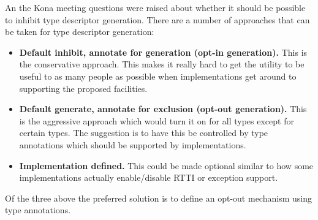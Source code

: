 An the Kona meeting questions were raised about whether it should be possible
to inhibit type descriptor generation. There are a number of approaches that
can be taken for type descriptor generation:

\begin{itemize}

 \item \textbf{Default inhibit, annotate for generation (opt-in generation).}
This is the conservative approach. This makes it really hard to get the
utility to be useful to as many people as possible when implementations get
around to supporting the proposed facilities.

 \item \textbf{Default generate, annotate for exclusion (opt-out generation).}
This is the aggressive approach which would turn it on for all types except
for certain types. The suggestion is to have this be controlled by type
annotations which should be supported by implementations.

 \item \textbf{Implementation defined.} This could be made optional similar to
how some implementations actually enable/disable RTTI or exception support.

\end{itemize}

Of the three above the preferred solution is to define an opt-out mechanism
using type annotations.